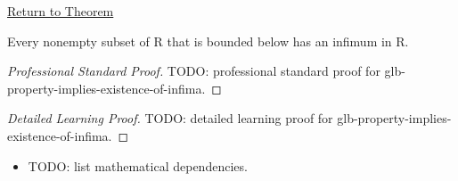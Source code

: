 \newpage
{}
\label{prf:glb-property-implies-existence-of-infima}

\begin{remark*}[Return]
\hyperref[thm:glb-property-implies-existence-of-infima]{Return to Theorem}
\end{remark*}

\begin{theorem*}
Every nonempty subset of R that is bounded below has an infimum in R.
\end{theorem*}

\begin{proof}[Professional Standard Proof]
\LRAProofBodyStart
TODO: professional standard proof for glb-property-implies-existence-of-infima.
\end{proof}

\begin{proof}[Detailed Learning Proof]
\LRAProofBodyStart
TODO: detailed learning proof for glb-property-implies-existence-of-infima.
\end{proof}

\begin{remark*}
\end{remark*}

\begin{dependencies}
\begin{itemize}
  \item TODO: list mathematical dependencies.
\end{itemize}
\end{dependencies}

\clearpage
